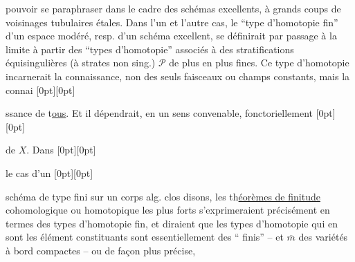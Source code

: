 %
pouvoir se paraphraser dans le cadre des schémas excellents, à grands coups de voisinages tubulaires étales.
Dans l'un et l'autre cas, le ``type d'homotopie fin'' d'un espace modéré, resp. d'un schéma excellent, se définirait par passage à la limite à partir des
``types d'homotopie'' associés à des stratifications équisingulières (à strates non sing.) $\mathcal{P}$ de plus en plus fines.
Ce type d'homotopie  incarnerait la connaissance, non des seuls faisceaux ou champs  constants, mais
 la connai%
\raisebox{0pt}[0pt][0pt]{\parbox{0pt}{}}%
ssance de
t\uline{ous}. Et il dépendrait, en un sens convenable,
fonctoriellement%
\raisebox{0pt}[0pt][0pt]{\parbox{0pt}{}}
de $X$. Dans%
\raisebox{0pt}[0pt][0pt]{\parbox{0pt}{}}
le cas d'un%
\raisebox{0pt}[0pt][0pt]{\parbox{0pt}{}}
schéma de type fini sur un corps alg. clos disons, les
th\uline{éorèmes de finitude} cohomologique ou homotopique les plus forts s'exprimeraient précisément en termes des types d'homotopie fin, et diraient que les types d'homotopie  qui en sont les élément constituants sont essentiellement des `` finis'' -- et $\overline{m}$ des variétés à bord compactes -- ou de façon plus précise,

